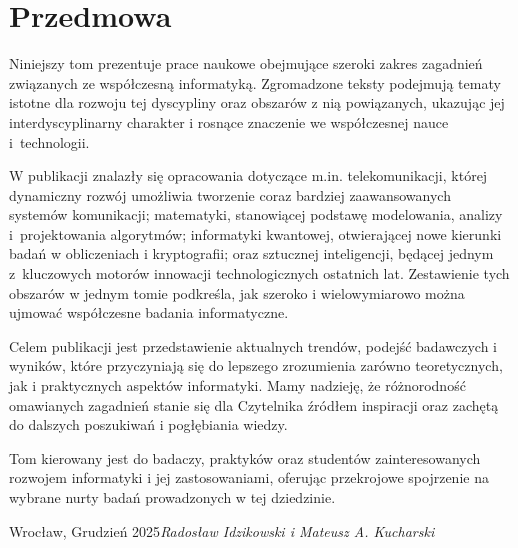 %
%


\chapter*{Przedmowa}
\thispagestyle{empty}

Niniejszy tom prezentuje prace naukowe obejmujące szeroki zakres zagadnień związanych ze współczesną informatyką. Zgromadzone teksty podejmują tematy istotne dla rozwoju tej dyscypliny oraz obszarów z nią powiązanych, ukazując jej interdyscyplinarny charakter i rosnące znaczenie we współczesnej nauce i~technologii.

W publikacji znalazły się opracowania dotyczące m.in. telekomunikacji, której dynamiczny rozwój umożliwia tworzenie coraz bardziej zaawansowanych systemów komunikacji; matematyki, stanowiącej podstawę modelowania, analizy i~projektowania algorytmów; informatyki kwantowej, otwierającej nowe kierunki badań w obliczeniach i kryptografii; oraz sztucznej inteligencji, będącej jednym z~kluczowych motorów innowacji technologicznych ostatnich lat. Zestawienie tych obszarów w jednym tomie podkreśla, jak szeroko i wielowymiarowo można ujmować współczesne badania informatyczne.

Celem publikacji jest przedstawienie aktualnych trendów, podejść badawczych i wyników, które przyczyniają się do lepszego zrozumienia zarówno teoretycznych, jak i praktycznych aspektów informatyki. Mamy nadzieję, że różnorodność omawianych zagadnień stanie się dla Czytelnika źródłem inspiracji oraz zachętą do dalszych poszukiwań i pogłębiania wiedzy.

Tom kierowany jest do badaczy, praktyków oraz studentów zainteresowanych rozwojem informatyki i jej zastosowaniami, oferując przekrojowe spojrzenie na wybrane nurty badań prowadzonych w tej dziedzinie.

 

\vspace{\baselineskip}
\begin{flushright}\noindent
Wroc\l aw, Grudzień 2025\hfill {\it Radosław Idzikowski i Mateusz A. Kucharski}\\
\end{flushright}


